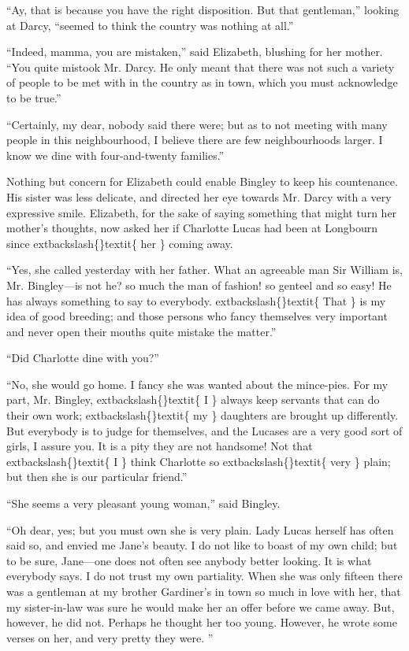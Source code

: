 \documentclass[10pt]{book}
\begin{document}
   “Ay, that is because you have the right disposition. But that
gentleman,” looking at Darcy, “seemed to think the country was nothing
at all.”
  

   “Indeed, mamma, you are mistaken,” said Elizabeth, blushing for her
mother. “You quite mistook Mr. Darcy. He only meant that there was not
such a variety of people to be met with in the country as in town, which
you must acknowledge to be true.”
  

   “Certainly, my dear, nobody said there were; but as to not meeting with
many people in this neighbourhood, I believe there are few
neighbourhoods larger. I know we dine with four-and-twenty families.”
  

   Nothing but concern for Elizabeth could enable Bingley to keep his
countenance. His sister was less delicate, and directed her eye towards
Mr. Darcy with a
   very expressive smile. Elizabeth, for the sake of
saying something that might turn her mother’s thoughts, now asked her if
Charlotte Lucas had been at Longbourn since
   	extbackslash\{\}textit\{
    her
   \}
   coming away.
  

   “Yes, she called yesterday with her father. What an agreeable man Sir
William is, Mr. Bingley—is not he? so much the man of fashion! so
genteel and so easy! He has always something to say to everybody.
   	extbackslash\{\}textit\{
    That
   \}
   is my idea of good breeding; and those persons who fancy themselves very
important and never open their mouths quite mistake the matter.”
  

   “Did Charlotte dine with you?”
  

   “No, she would go home. I fancy she was wanted about the mince-pies. For
my part, Mr. Bingley,
   	extbackslash\{\}textit\{
    I
   \}
   always keep servants that can do their own
work;
   	extbackslash\{\}textit\{
    my
   \}
   daughters are brought up differently. But everybody is to
judge for themselves, and the Lucases are a very good sort of girls, I
assure you. It is a pity they are not handsome! Not that
   	extbackslash\{\}textit\{
    I
   \}
   think
Charlotte so
   	extbackslash\{\}textit\{
    very
   \}
   plain; but then she is our particular friend.”
  

   “She seems a very pleasant young woman,” said Bingley.
  

   “Oh dear, yes; but you must own she is very plain. Lady Lucas herself
has often said so, and envied me Jane’s beauty. I do not like to boast
of my own child; but to be sure, Jane—one does not often see anybody
better looking. It is what everybody says. I do not trust my own
partiality. When she was only fifteen there was a gentleman at my
brother Gardiner’s in town so much in love with her, that my
sister-in-law was sure he would make her an offer before we came away.
But, however, he did not. Perhaps he thought her too young. However, he
wrote some verses on her, and very pretty they were.
   ”
  
\end{document}

